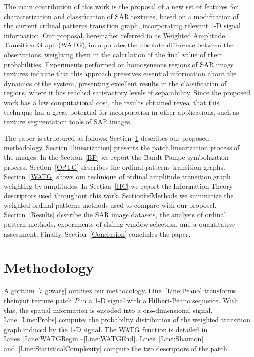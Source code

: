 \documentclass[journal]{IEEEtran}
\begin{document}
The main contribution of this work is the proposal of a new set of features for characterization and classification of SAR textures, based on a modification of the current ordinal patterns transition graph, incorporating relevant 1-D signal information.
Our proposal, hereinafter referred to as Weighted Amplitude Transition Graph (WATG), incorporates the absolute difference between the observations, weighting them in the calculation of the final value of their probabilities.
Experiments performed on homogeneous regions of SAR image textures indicate that this approach preserves essential information about the dynamics of the system, presenting excellent results in the classification of regions, where it has reached satisfactory levels of separability.
Since the proposed work has a low computational cost, the results obtained reveal that this technique has a great potential for incorporation in other applications, such as texture segmentation tools of SAR images.

The paper is structured as follows:
Section~\ref{methodology} describes our proposed methodology.
Section~\ref{linearization} presents the patch linearization process of the images.
In the Section~\ref{BP} we report the Bandt-Pompe symbolization process.
Section~\ref{OPTG} describes the ordinal patterns transition graphs.
Section~\ref{WATG} shows our technique of ordinal amplitude transition graph weighting by amplitudes.
In Section~\ref{HC} we report the Information Theory descriptors used throughout this work.
Section\~ref{Methods} we summarize the weighted ordinal patterns methods used to compare with our proposal.
Section~\ref{Results} describe the SAR image datasets, 
the analysis of ordinal pattern methods, 
experiments of sliding window selection, 
and a quantitative assessment.
Finally, Section~\ref{Conclusion} concludes the paper.

\section{Methodology}\label{methodology}

Algorithm~\ref{alg:watg} outlines our methodology.
Line~\ref{Line:Peano} transforms theinput texture patch $P$ in a 1-D signal with a Hilbert-Peano sequence.
%
With this, the spatial information is encoded into a one-dimensional signal.
%
Line~\ref{Line:Probs} computes 
the probability distribution of the weighted transition graph induced by the 1-D signal.
The WATG function is detailed in Lines~\ref{Line:WATGBegin}--\ref{Line:WATGEnd}.
%
Lines~\ref{Line:Shannon} and~\ref{Line:StatisticalComplexity} compute the two descriptors of the patch.
\end{document}
